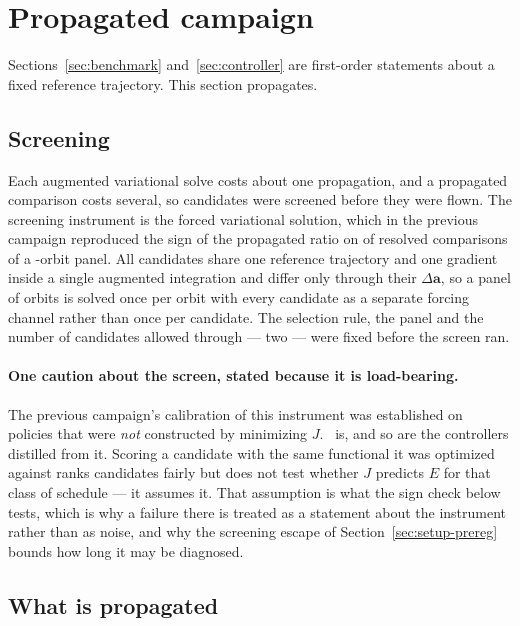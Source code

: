 \section{Propagated campaign}
\label{sec:campaign}

Sections~\ref{sec:benchmark} and~\ref{sec:controller} are first-order
statements about a fixed reference trajectory. This section propagates.

\subsection{Screening}

Each augmented variational solve costs about one propagation, and a propagated
comparison costs several, so candidates were screened before they were flown.
The screening instrument is the forced variational solution, which in the
previous campaign reproduced the sign of the propagated ratio on  of
 resolved comparisons of a -orbit panel. All candidates share one
reference trajectory and one gradient inside a single augmented integration and
differ only through their $\Delta\mathbf a$, so a panel of  orbits is
solved once per orbit with every candidate as a separate forcing channel rather
than once per candidate. The selection rule, the panel and the number of
candidates allowed through --- two --- were fixed before the screen ran.
 

\paragraph{One caution about the screen, stated because it is load-bearing.}
The previous campaign's calibration of this instrument was established on
policies that were \emph{not} constructed by minimizing $J$. \Asign\ is, and so
are the controllers distilled from it. Scoring a candidate with the same
functional it was optimized against ranks candidates fairly but does not test
whether $J$ predicts $E$ for that class of schedule --- it assumes it. That
assumption is what the sign check below tests, which is why a failure there is
treated as a statement about the instrument rather than as noise, and why the
screening escape of Section~\ref{sec:setup-prereg} bounds how long it may be
diagnosed.

\subsection{What is propagated}

